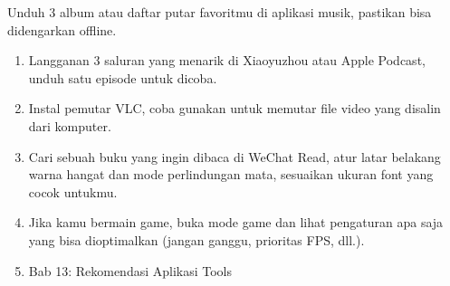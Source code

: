 \begin{tcbpractice}{Unduh 3 album atau daftar putar favoritmu di aplikasi musik, pastikan bisa didengarkan offline.}
\begin{enumerate}
  \item Langganan 3 saluran yang menarik di Xiaoyuzhou atau Apple Podcast, unduh satu episode untuk dicoba.
  \item Instal pemutar VLC, coba gunakan untuk memutar file video yang disalin dari komputer.
  \item Cari sebuah buku yang ingin dibaca di WeChat Read, atur latar belakang warna hangat dan mode perlindungan mata, sesuaikan ukuran font yang cocok untukmu.
  \item Jika kamu bermain game, buka mode game dan lihat pengaturan apa saja yang bisa dioptimalkan (jangan ganggu, prioritas FPS, dll.).
  \item Bab 13: Rekomendasi Aplikasi Tools
\end{enumerate}

\end{tcbpractice}

